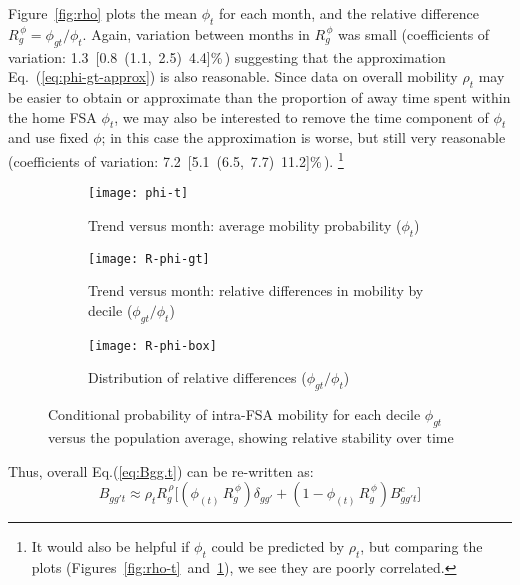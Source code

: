Figure~\ref{fig:rho} plots the mean $\phi_{t}$ for each month,
and the relative difference $R^{\,\phi}_{g} = \phi_{gt} / \phi_{t}$.
Again, variation between months in $R^{\,\phi}_{g}$ was small
(coefficients of variation: 1.3~[0.8~(1.1,~2.5)~4.4]\%\,)
suggesting that the approximation Eq.~(\ref{eq:phi-gt-approx}) is also reasonable.
Since data on overall mobility $\rho_{t}$ may be easier to obtain or approximate than
the proportion of away time spent within the home FSA $\phi_{t}$,
we may also be interested to remove the time component of $\phi_{t}$ and use fixed $\phi$;
in this case the approximation is worse, but still very reasonable
(coefficients of variation: 7.2~[5.1~(6.5,~7.7)~11.2]\%\,).%
\footnote{It would also be helpful if $\phi_{t}$ could be predicted by $\rho_{t}$,
  but comparing the plots (Figures~\ref{fig:rho-t}~and~\ref{fig:phi-t}),
  we see they are poorly correlated.}
\begin{figure}[ht]
  \begin{subfigure}[t]{0.297\linewidth}
    \texttt{[image: phi-t]}
    \caption{Trend versus month: average mobility probability ($\phi_{t}$)}
    \label{fig:phi-t}
  \end{subfigure}\hfill
  \begin{subfigure}[t]{0.33\linewidth}
    \texttt{[image: R-phi-gt]}
    \caption{Trend versus month: relative differences in mobility by decile ($\phi_{gt} / \phi_{t}$)}
    \label{fig:phi-gt}
  \end{subfigure}\hfill
  \begin{subfigure}[t]{0.33\linewidth}
    \texttt{[image: R-phi-box]}
    \caption{Distribution of relative differences ($\phi_{gt} / \phi_{t}$)}
    \label{fig:phi-box}
  \end{subfigure}
  \caption{Conditional probability of intra-FSA mobility for each decile $\phi_{gt}$
    versus the population average,
    showing relative stability over time}
  \label{fig:phi}
\end{figure}
\par
Thus, overall Eq.(\ref{eq:Bgg.t}) can be re-written as:
\begin{equation}\label{eq:Bgg.t.approx}
  B_{gg't} \approx \rho_{t} R^{\,\rho}_{g} \Big[
    (\phi_{(t)}\,R^{\,\phi}_{g}) \delta_{gg'} + (1-\phi_{(t)}\,R^{\,\phi}_{g}) B^c_{gg't}
  \Big]
\end{equation}

